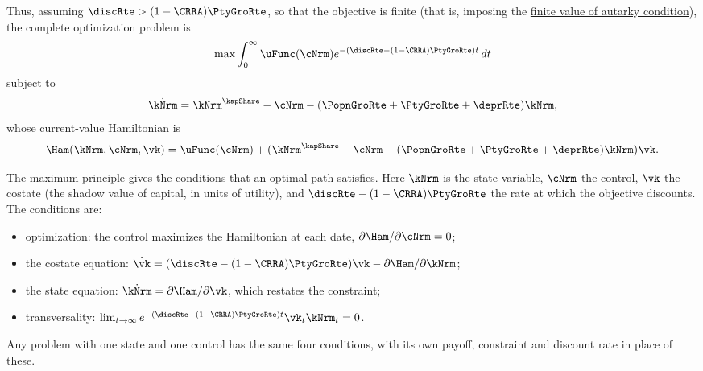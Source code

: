 \documentclass{econark}
\begin{document}
Thus, assuming $\discRte > (1-\CRRA) \PtyGroRte$, so that the objective is finite (that is, imposing the \href{https://llorracc.github.io/BufferStockTheory/#pffvac}{finite value of autarky condition}), the complete optimization problem
is
\begin{equation}
  \max \int_{0}^{\infty} \uFunc(\cNrm) e^{-(\discRte - (1-\CRRA)\PtyGroRte) t}\,dt
\end{equation}
subject to
\begin{equation}
  \dot{\kNrm} = \kNrm^{\kapShare}-\cNrm-(\PopnGroRte+\PtyGroRte+\deprRte)\kNrm,
\end{equation}
whose current-value Hamiltonian is
\begin{equation}
  \Ham(\kNrm,\cNrm,\vk) = \uFunc(\cNrm) + (\kNrm^{\kapShare} - \cNrm - (\PopnGroRte+\PtyGroRte+\deprRte)\kNrm)\vk.
\end{equation}

The maximum principle gives the conditions that an optimal path satisfies. Here $\kNrm$ is the state variable, $\cNrm$ the control, $\vk$ the costate (the shadow value of capital, in units of utility), and $\discRte-(1-\CRRA)\PtyGroRte$ the rate at which the objective discounts. The conditions are:
\begin{itemize}
\item optimization: the control maximizes the Hamiltonian at each date, $\partial\Ham/\partial\cNrm = 0$;
\item the costate equation: $\dot{\vk} = (\discRte-(1-\CRRA)\PtyGroRte)\vk - \partial\Ham/\partial\kNrm$;
\item the state equation: $\dot{\kNrm} = \partial\Ham/\partial\vk$, which restates the constraint;
\item transversality: $\lim_{t\rightarrow\infty} e^{-(\discRte-(1-\CRRA)\PtyGroRte)t}\vk_{t}\kNrm_{t} = 0$.
\end{itemize}
Any problem with one state and one control has the same four conditions, with its own payoff, constraint and discount rate in place of these.
\end{document}
